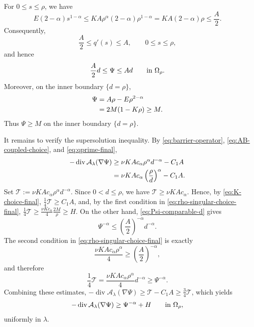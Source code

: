 \documentclass[11pt,leqno]{amsart}
\makeatletter
\renewenvironment{proof}[1][\proofname]{%
  \par
  \pushQED{\qed}%
  \normalfont
  \topsep6\p@\@plus6\p@\relax
  \trivlist
  \item[\hskip\labelsep\itshape #1\@addpunct{.}]%
  \hspace{0.5em}\ignorespaces
}{%
  \popQED
  \endtrivlist\@endpefalse
}
\makeatother
\begin{document}
\begin{proof}
For $0\le s\le\rho$, we have
\[
 E(2-\alpha)s^{1-\alpha}
 \le
 KA\rho^\alpha(2-\alpha)\rho^{1-\alpha}
 =KA(2-\alpha)\rho
 \le\frac A2.
\]
Consequently,
\begin{equation}\label{eq:qprime-final}
 \frac A2\le q'(s)\le A,
 \qquad 0\le s\le\rho,
\end{equation}
and hence
\begin{equation}\label{eq:Psi-comparable-d}
 \frac A2d\le\Psi\le Ad
 \qquad\hbox{in }\Omega_\rho.
\end{equation}
Moreover, on the inner boundary $\{d=\rho\}$,
\begin{align}
 \Psi
 &=A\rho-E\rho^{2-\alpha}\notag\\
 &=2M(1-K\rho)\ge M.
 \label{eq:inner-boundary-barrier}
\end{align}
Thus $\Psi\ge M$ on the inner boundary $\{d=\rho\}$.

It remains to verify the supersolution inequality.  By
\eqref{eq:barrier-operator}, \eqref{eq:AB-coupled-choice}, and
\eqref{eq:qprime-final},
\begin{align}
 -\operatorname{div}\mathcal A_\lambda(\nabla\Psi)
 &\ge
 \nu KAc_\alpha\rho^\alpha d^{-\alpha}-C_1A\notag\\
 &=
 \nu KAc_\alpha\left(\frac{\rho}{d}\right)^\alpha-C_1A.
 \label{eq:barrier-coupled-lower}
\end{align}
Set $\mathcal T:=\nu KAc_\alpha\rho^\alpha d^{-\alpha}$. Since
$0<d\le\rho$, we have $\mathcal T\ge\nu KAc_\alpha$. Hence, by
\eqref{eq:K-choice-final}, $\frac14\mathcal T\ge C_1A$, and, by the first
condition in \eqref{eq:rho-singular-choice-final},
$\frac14\mathcal T\ge\frac{\nu Kc_\alpha}{4}\frac{2M}{\rho}\ge H$.  On the other hand,
\eqref{eq:Psi-comparable-d} gives
\[
 \Psi^{-\alpha}
 \le
 \left(\frac A2\right)^{-\alpha}d^{-\alpha}.
\]
The second condition in \eqref{eq:rho-singular-choice-final} is exactly
\[
 \frac{\nu KAc_\alpha\rho^\alpha}{4}
 \ge
 \left(\frac A2\right)^{-\alpha},
\]
and therefore
\[
 \frac14\mathcal T=\frac{\nu KAc_\alpha\rho^\alpha}{4}d^{-\alpha}
 \ge \Psi^{-\alpha}.
\]
Combining these estimates, $-\operatorname{div}\mathcal A_\lambda(\nabla\Psi)
\ge\mathcal T-C_1A\ge\frac34\mathcal T$, which yields
\begin{equation}\label{eq:Psi-supersolution}
 -\operatorname{div}\mathcal A_\lambda(\nabla\Psi)
 \ge \Psi^{-\alpha}+H
 \qquad\hbox{in }\Omega_\rho,
\end{equation}
uniformly in $\lambda$.


\end{proof}
\end{document}
